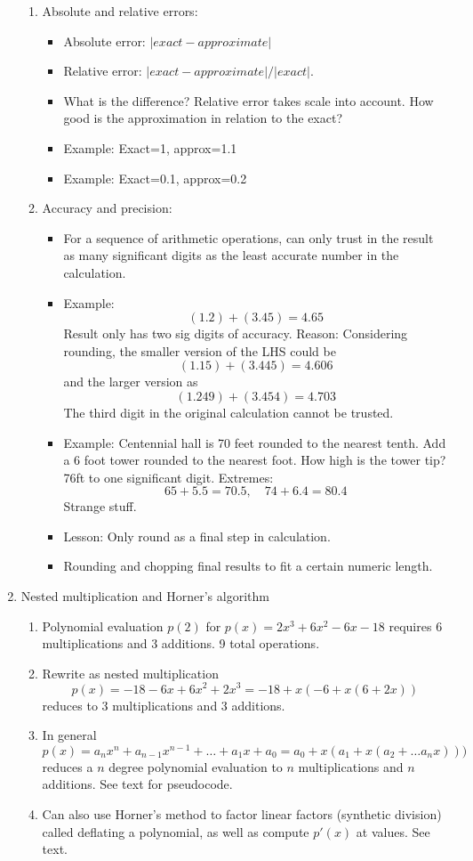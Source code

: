 \documentclass{article}
\theoremstyle{remark}
\begin{document}
\begin{enumerate}
\begin{enumerate}
\item Absolute and relative errors:
\begin{itemize}
\item Absolute error: $|exact - approximate|$
\item Relative error: $|exact - approximate|/|exact|$. 
\item What is the difference? Relative error takes scale into account. How good is the approximation in relation to the exact?
\item Example: Exact=1, approx=1.1
\item Example: Exact=0.1, approx=0.2
\end{itemize}
\item Accuracy and precision:
\begin{itemize}
\item For a sequence of arithmetic operations, can only trust in the result as many significant digits as the least accurate number in the calculation.
\item Example: 
\[
(1.2)+(3.45)=4.65
\]
Result only has two sig digits of accuracy. Reason: Considering rounding, the smaller version of the LHS could be 
\[
(1.15)+(3.445)=4.606
\]
and the larger version as
\[
(1.249)+(3.454)=4.703
\]
The third digit in the original calculation cannot be trusted.
\item Example: Centennial hall is 70 feet rounded to the nearest tenth. Add a 6 foot tower rounded to the nearest foot. How high is the tower tip? 76ft to one significant digit.  Extremes:
\[
65+5.5 = 70.5, \quad 74+6.4 = 80.4
\]
Strange stuff.
\item Lesson: Only round as a final step in calculation.
\item Rounding and chopping final results to fit a certain numeric length.
\end{itemize}
\end{enumerate}


\item Nested multiplication and Horner's algorithm
\begin{enumerate}
\item Polynomial evaluation $p(2)$ for $p(x)=2x^3+6x^2-6x-18$ requires 6 multiplications and 3 additions. 9 total operations.
\item Rewrite as nested multiplication
\[
p(x)=-18-6x+6x^2+2x^3 = -18+x(-6+x(6+2x))
\]
reduces to 3 multiplications and 3 additions. 
\item In general
\[
p(x) = a_n x^n + a_{n-1} x^{n-1} + \dots + a_1 x + a_0
= a_0 + x(a_1 + x (a_2 + \dots a_n x )))
\]
reduces a $n$ degree polynomial evaluation to $n$ multiplications and $n$ additions. See text for pseudocode.
\item Can also use Horner's method to factor linear factors (synthetic division) called deflating a polynomial, as well as compute $p'(x)$ at values. See text.
\end{enumerate}


\end{enumerate}
\end{document}
